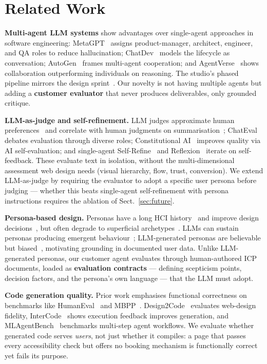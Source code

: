 \documentclass[a4paper]{llncs}
\begin{document}
\section{Related Work}
\label{sec:related}

\textbf{Multi-agent LLM systems} show advantages over single-agent approaches
in software engineering: MetaGPT~\cite{hong2024metagpt} assigns
product-manager, architect, engineer, and QA roles to reduce hallucination;
ChatDev~\cite{qian2024chatdev} models the lifecycle as conversation;
AutoGen~\cite{wu2024autogen} frames multi-agent cooperation; and
AgentVerse~\cite{chen2024agentverse} shows collaboration outperforming
individuals on reasoning. The studio's phased pipeline mirrors the design
sprint~\cite{knapp2016sprint}. Our novelty is not having multiple agents but
adding a \textbf{customer evaluator} that never produces deliverables, only
grounded critique.

\textbf{LLM-as-judge and self-refinement.} LLM judges approximate human
preferences~\cite{zheng2023judging} and correlate with human judgments on
summarisation~\cite{liu2023geval}; ChatEval~\cite{chan2024chateval} debates
evaluation through diverse roles; Constitutional AI~\cite{bai2022constitutional}
improves quality via AI self-evaluation; and single-agent
Self-Refine~\cite{madaan2023selfrefine} and Reflexion~\cite{shinn2023reflexion}
iterate on self-feedback. These evaluate text in isolation, without the
multi-dimensional assessment web design needs (visual hierarchy, flow, trust,
conversion). We extend LLM-as-judge by requiring the evaluator to adopt a
specific user persona before judging --- whether this beats single-agent
self-refinement with persona instructions requires the ablation of
Sect.~\ref{sec:future}.

\textbf{Persona-based design.} Personas have a long HCI
history~\cite{grudin2002personas,nielsen2019personas,matthews2012personas,cooper1999inmates}
and improve design decisions~\cite{pruitt2006persona}, but often degrade to
superficial archetypes~\cite{long2009personas}. LLMs can sustain personas
producing emergent behaviour~\cite{park2023generative}; LLM-generated personas
are believable but biased~\cite{salminen2024personas}, motivating grounding in
documented user data. Unlike LLM-generated personas, our customer agent
evaluates through human-authored ICP documents, loaded as \textbf{evaluation
contracts} --- defining scepticism points, decision factors, and the persona's
own language --- that the LLM must adopt.

\textbf{Code generation quality.} Prior work emphasises functional correctness
on benchmarks like HumanEval~\cite{chen2021humaneval} and
MBPP~\cite{austin2021program}. Design2Code~\cite{si2025design2code} evaluates
web-design fidelity, InterCode~\cite{yang2023intercode} shows execution
feedback improves generation, and MLAgentBench~\cite{huang2024mlagentbench}
benchmarks multi-step agent workflows. We evaluate whether generated code
serves \emph{users}, not just whether it compiles: a page that passes every
accessibility check but offers no booking mechanism is functionally correct yet
fails its purpose.
\end{document}
